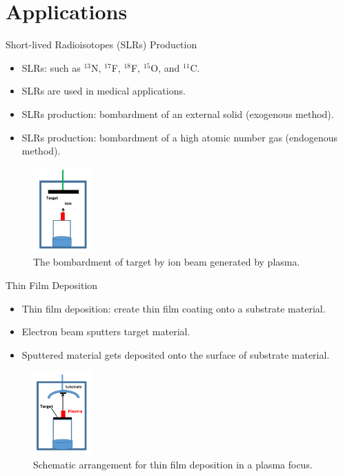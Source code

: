\section{Applications}

\begin{frame} {Short-lived Radioisotopes (SLRs) Production}
    \begin{itemize}
        \item SLRs: such as $^{13}$N, $^{17}$F, $^{18}$F, $^{15}$O, and $^{11}$C.
        \item SLRs are used in medical applications.
        \item SLRs production: bombardment of an external solid (exogenous method).
        \item SLRs production: bombardment of a high atomic number gas (endogenous method).
    \end{itemize}
    \begin{figure}
        \centering
        \includegraphics[width=0.2\textwidth]{figures/slr-production.png}
        \caption{The bombardment of target by ion beam generated by plasma.}
        \label{fig:slr-production}
    \end{figure}
\end{frame}

\begin{frame} {Thin Film Deposition}
    \begin{itemize}
        \item Thin film deposition: create thin film coating onto a substrate material.
        \item Electron beam sputters target material.
        \item Sputtered material gets deposited onto the surface of substrate material.
    \end{itemize}
    \begin{figure}
        \centering
        \includegraphics[width=0.2\textwidth]{figures/thin-film-doposition.png}
        \caption{Schematic arrangement for thin film deposition in a plasma focus.}
        \label{fig:thin-film-deposition}
    \end{figure}
\end{frame}

